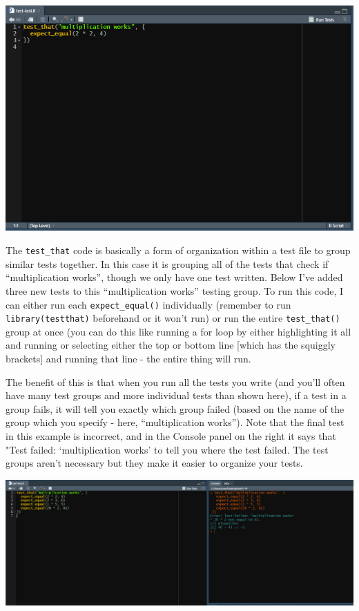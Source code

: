 \documentclass[
  12pt,
  openany]{book}
\begin{document}
\includegraphics{images/usethis_test_default_example.PNG}

The \texttt{test\_that} code is basically a form of organization within a test file to group similar tests together. In this case it is grouping all of the tests that check if ``multiplication works'', though we only have one test written. Below I've added three new tests to this ``multiplication works'' testing group. To run this code, I can either run each \texttt{expect\_equal()} individually (remember to run \texttt{library(testthat)} beforehand or it won't run) or run the entire \texttt{test\_that()} group at once (you can do this like running a for loop by either highlighting it all and running or selecting either the top or bottom line {[}which has the squiggly brackets{]} and running that line - the entire thing will run.

The benefit of this is that when you run all the tests you write (and you'll often have many test groups and more individual tests than shown here), if a test in a group fails, it will tell you exactly which group failed (based on the name of the group which you specify - here, ``multiplication works''). Note that the final test in this example is incorrect, and in the Console panel on the right it says that "Test failed: `multiplication works' to tell you where the test failed. The test groups aren't necessary but they make it easier to organize your tests.

\includegraphics{images/usethis_test_default_example2.PNG}
\end{document}
